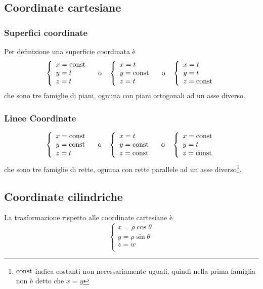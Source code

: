 \subsection{Coordinate cartesiane}
\subsubsection{Superfici coordinate}
Per definizione una superficie coordinata è
\[
  \left\{\begin{array}{l}
    x=\text{const} \\
    y=t      \\
    z=t\end{array}\right.
  \quad
  \text{o}
  \quad
  \left\{\begin{array}{l}
    x=t      \\
    y=\text{const} \\
    z=t\end{array}\right.
  \quad
  \text{o}
  \quad
  \left\{\begin{array}{l}
    x=t \\
    y=t \\
    z=\text{const}\end{array}\right.
\]
che sono tre famiglie di piani, ognuna con piani ortogonali ad un asse diverso.
\subsubsection{Linee Coordinate}
\[
  \left\{\begin{array}{l}
    x=\text{const} \\
    y=\text{const} \\
    z=t\end{array}\right.
  \quad
  \text{o}
  \quad
  \left\{\begin{array}{l}
    x=t      \\
    y=\text{const} \\
    z=\text{const}\end{array}\right.
  \quad
  \text{o}
  \quad
  \left\{\begin{array}{l}
    x=\text{const} \\
    y=t      \\
    z=\text{const}\end{array}\right.
\]
che sono tre famiglie di rette, ognuna con rette parallele ad un asse diverso\footnote{$\text{const}$ indica costanti non necessariamente uguali, quindi nella prima famiglia non è detto che $x=y$}.
\subsection{Coordinate cilindriche}
La trasformazione rispetto alle coordinate cartesiane è
\[\left\{\begin{array}{l}
    x=\rho\cos\theta \\
    y=\rho\sin\theta \\
    z=w              \\
  \end{array}\right.
\]

